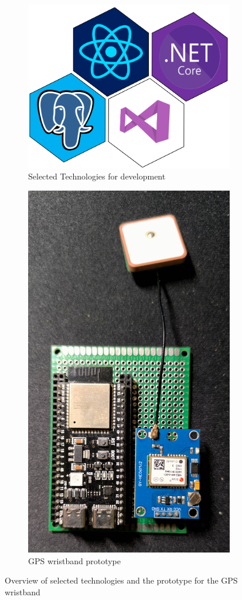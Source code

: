 \begin{figure}[H]
    \centering
    \begin{subfigure}{0.48\textwidth}
        \centering
        \includegraphics[width=\linewidth]{figs/Selected_Technologies.png}
        \caption{Selected Technologies for development}
        \label{fig:Selected_Technologies}
    \end{subfigure}
    \hfill
    \begin{subfigure}{0.48\textwidth}
        \centering
        \includegraphics[width=0.4\linewidth,keepaspectratio]{figs/prototipo-pulseira.jpg}
        \caption{GPS wristband prototype}
        \label{fig:wristband_prototype}
    \end{subfigure}
    \caption{Overview of selected technologies and the prototype for the GPS wristband }
    \label{fig:technologies_and_prototype}
\end{figure}



